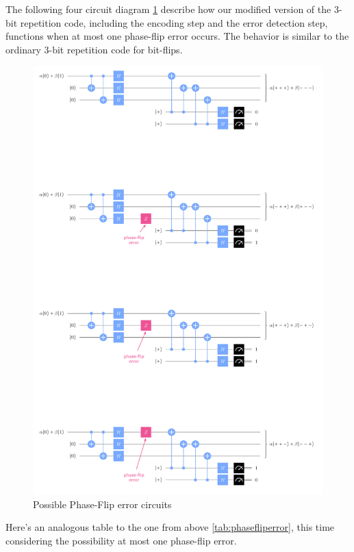 \documentclass[12pt, oneside]{book}
\theoremstyle{definition}
\theoremstyle{definition}
\theoremstyle{remark}
\begin{document}
The following four circuit diagram \ref{fig:possphaseflip} describe how our modified version of the $3$-bit repetition code, including the encoding step and the error detection step, functions when at most one phase-flip error occurs. The behavior is similar to the ordinary $3$-bit repetition code for bit-flips.
\begin{figure}[ht]
    \centering
    \includegraphics[width=0.75\linewidth]{Images/phasefliperr4circs.png}
    \caption{Possible Phase-Flip error circuits}
    \label{fig:possphaseflip}
\end{figure}
Here's an analogous table to the one from above \ref{tab:phasefliperror}, this time considering the possibility at most one phase-flip error.
\end{document}
